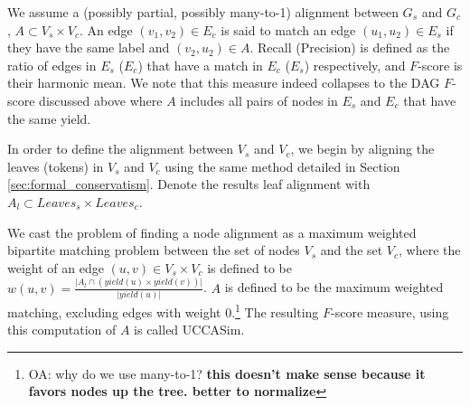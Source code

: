 \documentclass[letter,11pt]{article}
\newcommand{\oa}[1]{\footnote{\color{red}OA: #1}}
\begin{document}


We assume a (possibly partial, possibly many-to-1) alignment between $G_s$ and $G_c$,
$A \subset V_s \times V_c$. An edge $(v_1,v_2) \in E_c$ is said to match an edge
$(u_1,u_2) \in E_s$ if they have the same label and $(v_2,u_2) \in A$. Recall (Precision)
is defined as the ratio of edges in $E_s$ ($E_c$) that have a match in $E_c$ ($E_s$) respectively, and
$F$-score is their harmonic mean. We note that this measure indeed collapses to the
DAG $F$-score discussed above where $A$ includes all pairs of nodes in $E_s$ and $E_c$ that have
the same yield.

In order to define the alignment between $V_s$ and $V_c$, we begin by aligning the leaves
(tokens) in $V_s$ and $V_c$ using the same method detailed in Section \ref{sec:formal_conservatism}.
Denote the results leaf alignment with $A_l \subset Leaves_s \times Leaves_c$.

We cast the problem of finding a node alignment as a maximum weighted bipartite matching problem between
the set of nodes $V_s$ and the set $V_c$, where the weight of an edge $(u,v) \in V_s \times V_c$ is
defined to be $w(u,v) = \frac{\vert A_l \cap (yield(u) \times yield(v))\vert}{\vert yield(u) \vert} $.
$A$ is defined to be the maximum weighted matching, excluding edges
with weight 0.\oa{why do we use many-to-1? {\bf this doesn't make sense because it favors
nodes up the tree. better to normalize}}
The resulting $F$-score measure, using this computation of $A$ is called {\sc UCCASim}.
\end{document}
